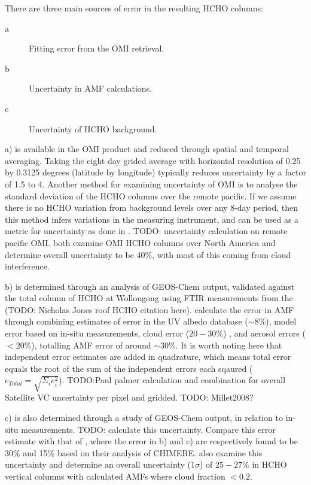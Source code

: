     There are three main sources of error in the resulting HCHO columns:
    \begin{description}
      \item[a] Fitting error from the OMI retrieval.
      \item[b] Uncertainty in AMF calculations.
      \item[c] Uncertainty of HCHO background.
    \end{description}
    
    a) is available in the OMI product and reduced through spatial and temporal averaging.
    Taking the eight day grided average with horizontal resolution of 0.25 by 0.3125 degrees (latitude by longitude) typically reduces uncertainty by a factor of 1.5 to 4.
    Another method for examining uncertainty of OMI is to analyse the standard deviation of the HCHO columns over the remote pacific.
    If we assume there is no HCHO variation from background levels over any 8-day period, then this method infers variations in the measuring instrument, and can be used as a metric for uncertainty as done in \citet{DeSmedt2012}.
    TODO: uncertainty calculation on remote pacific OMI.
    \cite{Millet2006, Palmer2006} both examine OMI HCHO columns over North America and determine overall uncertainty to be 40\%, with most of this coming from cloud interference.
    
    b) is determined through an analysis of GEOS-Chem output, validated against the total column of HCHO at Wollongong using FTIR measurements from the (TODO: Nicholas Jones roof HCHO citation here).
    \cite{Palmer2006} calculate the error in AMF through combining estimates of error in the UV albedo database ($\sim 8$\%), model error based on in-situ measurements, cloud error  ($20-30$\%) \citep{Martin2003}, and aerosol errors ($<20$\%), totalling AMF error of around $\sim 30$\%.
    It is worth noting here that independent error estimates are added in quadrature, which means total error equals the root of the sum of the independent errors each sqaured ($e_{Total}=\sqrt{\Sigma_i e_i^2}$).
    TODO:Paul palmer calculation and combination for overall Satellite VC uncertainty per pixel and gridded.
    TODO: Millet2008?
    
    c) is also determined through a study of GEOS-Chem output, in relation to in-situ measurements.
    TODO: calculate this uncertainty.
    Compare this error estimate with that of \citet{Curci2010}, where the error in b) and c) are respectively found to be 30\% and 15\% based on their analysis of CHIMERE.
    \cite{Millet2008} also examine this uncertainty and determine an overall uncertainty ($1\sigma$) of $25-27\%$ in HCHO vertical columns with calculated AMFs where cloud fraction $< 0.2$.
    
